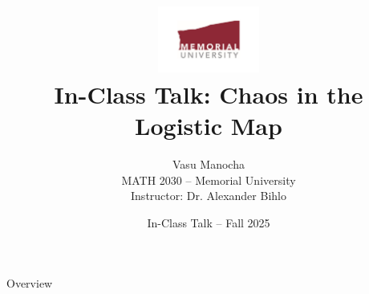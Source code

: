 \documentclass{beamer}
\title{
  \includegraphics[width=0.25\textwidth]{../logo/mun_logo.pdf}\\[1em]
  In-Class Talk: Chaos in the Logistic Map
}
\author{Vasu Manocha \\
MATH 2030 – Memorial University \\
Instructor: Dr. Alexander Bihlo}
\date{In-Class Talk – Fall 2025}
\begin{document}
\begin{frame}
  \titlepage
\end{frame}

\begin{frame}{Overview}
\end{frame}
\end{document}
